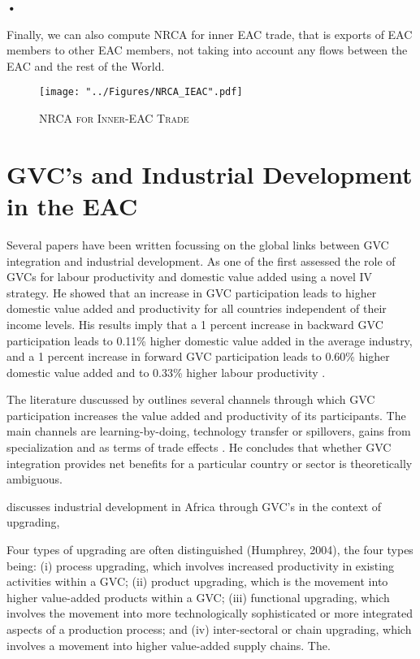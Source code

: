 \textbf{\textbf{•}}\documentclass[a4paper]{article}
\begin{document}
Finally, we can also compute NRCA for inner EAC trade, that is exports of EAC members to other EAC members, not taking into account any flows between the EAC and the rest of the World. 

\begin{figure}[h!]
\centering
\caption{\label{fig:NRCA_IEAC}\textsc{NRCA for Inner-EAC Trade}}
\texttt{[image: "../Figures/NRCA\_IEAC".pdf]} %
\end{figure}
\FloatBarrier

\section{GVC's and Industrial Development in the EAC}
Several papers have been written focussing on the global links between GVC integration and industrial development. As one of the first \citet{Kummritz20161} assessed the role of GVCs for labour productivity and domestic value added using a novel IV strategy. He showed that an increase in GVC participation leads to higher domestic value added and productivity for all countries independent of their income levels. His results imply that a 1 percent increase in backward GVC participation leads to 0.11\% higher domestic value added in the average industry, and  a 1 percent increase in forward GVC participation leads to 0.60\% higher domestic value added and to 0.33\% higher labour productivity \citep{Kummritz20161}. \newline


The literature duscussed by \citet{Kummritz20161} outlines several channels through which GVC participation increases the value added and productivity of its participants. The main channels are learning-by-doing, technology transfer or spillovers, gains from specialization and as terms of trade effects  \citep{Kummritz20161}. He concludes that whether GVC integration provides net benefits for a particular country or sector is theoretically ambiguous. \newline


\citet{foster2015global} discusses industrial development in Africa through GVC's in the context of upgrading, 

Four types of upgrading are often distinguished (Humphrey, 2004), the four types being: (i) process upgrading, which involves increased productivity in existing activities within a GVC; (ii) product upgrading, which is the movement into higher value-added products within a GVC; (iii) functional upgrading, which involves the movement into more technologically sophisticated or more integrated aspects of a production process; and (iv) inter-sectoral or chain upgrading, which involves a movement into higher value-added supply chains. The.
\end{document}
